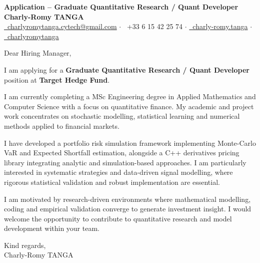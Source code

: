 \documentclass[10pt, letterpaper]{article}
\newcommand{\targetCompany}{Target Hedge Fund}
\newcommand{\targetRole}{Graduate Quantitative Research / Quant Developer}
\begin{document}
\begin{center}
    \textbf{\LARGE Application -- \targetRole{}} \\[0.2cm]
    \textbf{\large Charly-Romy TANGA} \\[0.2cm]
    \href{mailto:charlyromytanga.cytech@gmail.com}{\faEnvelope\ charlyromytanga.cytech@gmail.com}
    \quad$\cdot$\quad
    \faPhone\ +33 6 15 42 25 74
    \quad$\cdot$\quad
    \href{https://www.linkedin.com/in/charly-romy-tanga}{\faLinkedin\ charly-romy.tanga}
    \quad$\cdot$\quad
    \href{https://github.com/charlyromytanga}{\faGithub\ charlyromytanga}
\end{center}

Dear Hiring Manager,

I am applying for a \textbf{\targetRole{}} position at \textbf{\targetCompany{}}.

I am currently completing a MSc Engineering degree in Applied Mathematics and Computer Science with a focus on quantitative finance. My academic and project work concentrates on stochastic modelling, statistical learning and numerical methods applied to financial markets.

I have developed a portfolio risk simulation framework implementing Monte-Carlo VaR and Expected Shortfall estimation, alongside a C++ derivatives pricing library integrating analytic and simulation-based approaches. I am particularly interested in systematic strategies and data-driven signal modelling, where rigorous statistical validation and robust implementation are essential.

I am motivated by research-driven environments where mathematical modelling, coding and empirical validation converge to generate investment insight. I would welcome the opportunity to contribute to quantitative research and model development within your team.

Kind regards,\\
Charly-Romy TANGA
\end{document}
